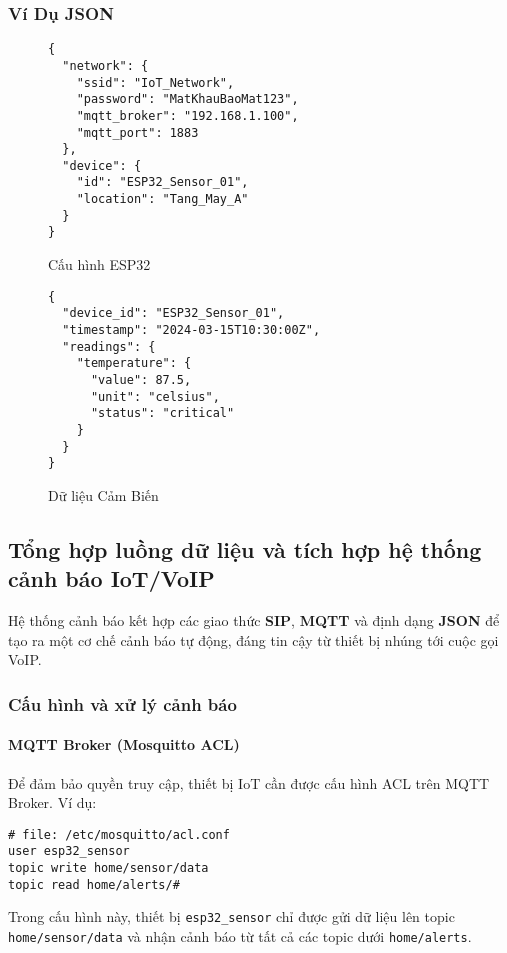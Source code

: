 \subsubsection{Ví Dụ JSON}
\label{subsubsec:json_examples}

\begin{figure}[H]
\centering
\begin{verbatim}
{
  "network": {
    "ssid": "IoT_Network",
    "password": "MatKhauBaoMat123",
    "mqtt_broker": "192.168.1.100",
    "mqtt_port": 1883
  },
  "device": {
    "id": "ESP32_Sensor_01",
    "location": "Tang_May_A"
  }
}
\end{verbatim}
\caption{Cấu hình ESP32}
\label{fig:json_esp32_config}
\end{figure}

\begin{figure}[H]
\centering
\begin{verbatim}
{
  "device_id": "ESP32_Sensor_01",
  "timestamp": "2024-03-15T10:30:00Z",
  "readings": {
    "temperature": {
      "value": 87.5,
      "unit": "celsius",
      "status": "critical"
    }
  }
}
\end{verbatim}
\caption{Dữ liệu Cảm Biến}
\label{fig:json_sensor_data}
\end{figure}

\subsection{Tổng hợp luồng dữ liệu và tích hợp hệ thống cảnh báo IoT/VoIP}
\label{subsec:system_integration}

Hệ thống cảnh báo kết hợp các giao thức \textbf{SIP}, \textbf{MQTT} và định dạng \textbf{JSON} để tạo ra một cơ chế cảnh báo tự động, đáng tin cậy từ thiết bị nhúng tới cuộc gọi VoIP.

\subsubsection{Cấu hình và xử lý cảnh báo}
\paragraph{MQTT Broker (Mosquitto ACL)}
Để đảm bảo quyền truy cập, thiết bị IoT cần được cấu hình ACL trên MQTT Broker. Ví dụ:
\begin{verbatim}
# file: /etc/mosquitto/acl.conf
user esp32_sensor
topic write home/sensor/data
topic read home/alerts/#
\end{verbatim}
Trong cấu hình này, thiết bị \texttt{esp32\_sensor} chỉ được gửi dữ liệu lên topic \texttt{home/sensor/data} và nhận cảnh báo từ tất cả các topic dưới \texttt{home/alerts}.

